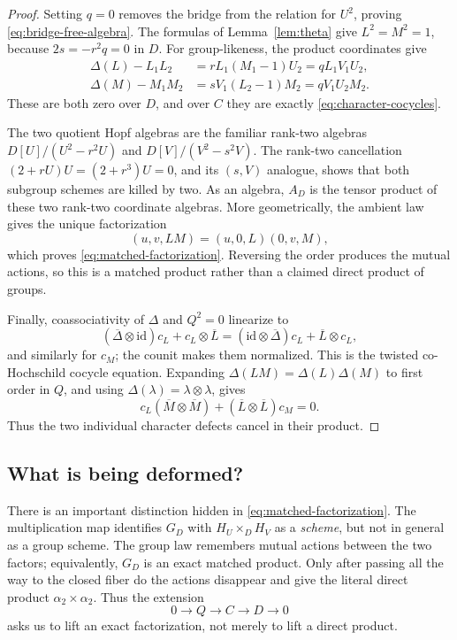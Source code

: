 \documentclass[11pt]{amsart}
\theoremstyle{definition}
\theoremstyle{remark}
\newcommand{\ot}{\otimes}
\newcommand{\id}{\mathrm{id}}
\begin{document}
\begin{proof}
Setting \(q=0\) removes the bridge from the relation for \(U^2\), proving
\eqref{eq:bridge-free-algebra}.  The formulas of Lemma~\ref{lem:theta} give
\(L^2=M^2=1\), because \(2s=-r^2q=0\) in \(D\).  For group-likeness, the
product coordinates give
\begin{align*}
 \Delta(L)-L_1L_2
 &=rL_1(M_1-1)U_2=qL_1V_1U_2,\\
 \Delta(M)-M_1M_2
 &=sV_1(L_2-1)M_2=qV_1U_2M_2.
\end{align*}
These are both zero over \(D\), and over \(C\) they are exactly
\eqref{eq:character-cocycles}.

The two quotient Hopf algebras are the familiar rank-two algebras
\(D[U]/(U^2-r^2U)\) and \(D[V]/(V^2-s^2V)\).  The rank-two cancellation
\((2+rU)U=(2+r^3)U=0\), and its \((s,V)\) analogue, shows that both subgroup
schemes are killed by two.  As an algebra, \(A_D\) is the tensor product of
these two rank-two coordinate algebras.  More geometrically, the ambient
law gives the unique factorization
\[
 (u,v,LM)=(u,0,L)(0,v,M),
\]
which proves \eqref{eq:matched-factorization}.  Reversing the order produces
the mutual actions, so this is a matched product rather than a claimed
direct product of groups.

Finally, coassociativity of \(\Delta\) and \(Q^2=0\) linearize to
\[
 (\overline\Delta\ot\id)c_L+c_L\ot\overline L
 = (\id\ot\overline\Delta)c_L+\overline L\ot c_L,
\]
and similarly for \(c_M\); the counit makes them normalized.  This is the
twisted co-Hochschild cocycle equation.  Expanding
\(\Delta(LM)=\Delta(L)\Delta(M)\) to first order in \(Q\), and using
\(\Delta(\lambda)=\lambda\ot\lambda\), gives
\[
 c_L(\overline M\ot\overline M)
 +(\overline L\ot\overline L)c_M=0.
\]
Thus the two individual character defects cancel in their product.
\end{proof}

\subsection{What is being deformed?}
\label{subsec:what-deforms}

There is an important distinction hidden in
\eqref{eq:matched-factorization}.  The multiplication map identifies
\(G_D\) with \(H_U\times_DH_V\) as a \emph{scheme}, but not in general as
a group scheme.  The group law remembers mutual actions between the two
factors; equivalently, \(G_D\) is an exact matched product.  Only after
passing all the way to the closed fiber do the actions disappear and give
the literal direct product
\(\alpha _2\times\alpha _2\).  Thus the extension
\[
 0\longrightarrow Q\longrightarrow C\longrightarrow D\longrightarrow0
\]
asks us to lift an exact factorization, not merely to lift a direct
product.
\end{document}

